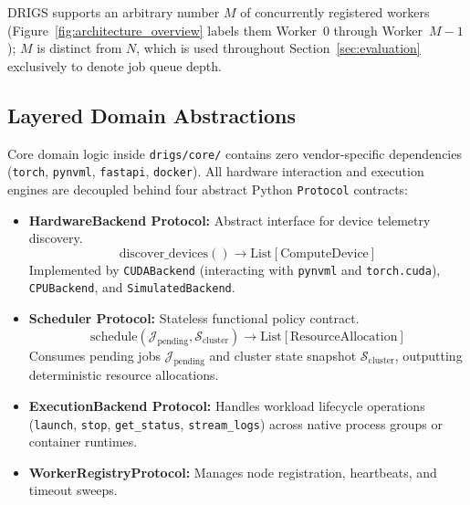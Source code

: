 DRIGS supports an arbitrary number $M$ of concurrently registered workers (Figure~\ref{fig:architecture_overview} labels them Worker~$0$ through Worker~$M-1$); $M$ is distinct from $N$, which is used throughout Section~\ref{sec:evaluation} exclusively to denote job queue depth.

\subsection{Layered Domain Abstractions}
Core domain logic inside \texttt{drigs/core/} contains zero vendor-specific dependencies (\texttt{torch}, \texttt{pynvml}, \texttt{fastapi}, \texttt{docker}). All hardware interaction and execution engines are decoupled behind four abstract Python \texttt{Protocol} contracts:

\begin{itemize}
    \item \textbf{HardwareBackend Protocol:} Abstract interface for device telemetry discovery.
    \begin{equation}
        \text{discover\_devices}() \rightarrow \text{List}[\text{ComputeDevice}]
    \end{equation}
    Implemented by \texttt{CUDABackend} (interacting with \texttt{pynvml} and \texttt{torch.cuda}), \texttt{CPUBackend}, and \texttt{SimulatedBackend}.
    
    \item \textbf{Scheduler Protocol:} Stateless functional policy contract.
    \begin{equation}
        \text{schedule}(\mathcal{J}_{\text{pending}}, \mathcal{S}_{\text{cluster}}) \rightarrow \text{List}[\text{ResourceAllocation}]
    \end{equation}
    Consumes pending jobs $\mathcal{J}_{\text{pending}}$ and cluster state snapshot $\mathcal{S}_{\text{cluster}}$, outputting deterministic resource allocations.
    
    \item \textbf{ExecutionBackend Protocol:} Handles workload lifecycle operations (\texttt{launch}, \texttt{stop}, \texttt{get\_status}, \texttt{stream\_logs}) across native process groups or container runtimes.
    
    \item \textbf{WorkerRegistryProtocol:} Manages node registration, heartbeats, and timeout sweeps.
\end{itemize}

